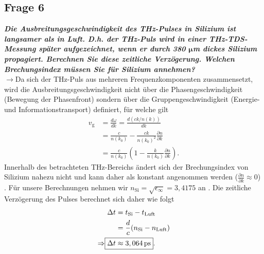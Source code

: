 \subsection{\label{subsec:FZV6}Frage 6}
\textbf{\textit{Die Ausbreitungsgeschwindigkeit des THz-Pulses in Silizium ist langsamer als in
Luft. D.h. der THz-Puls wird in einer THz-TDS-Messung später aufgezeichnet,
wenn er durch 380 $\mathbf{\mu}$m dickes Silizium propagiert. Berechnen Sie diese zeitliche
Verzögerung. Welchen Brechungsindex müssen Sie für Silizium annehmen?}}\\
$\rightarrow$Da sich der THz-Puls aus mehreren Frequenzkomponenten zusammensetzt, wird 
die Ausbreitungsgeschwindigkeit nicht über die Phasengeschwindigkeit (Bewegung der Phasenfront)
sondern über die Gruppengeschwindigkeit (Energie- und Informationstransport) definiert,
für welche gilt
\begin{align}
    v_{\text{g}} &= \frac{d\omega}{dk} = \frac{d(ck/n(k))}{dk} \\
    &= \frac{c}{n(k_{0})} - \frac{ck}{n(k_{0})^{2}}\frac{\partial n}{\partial k} \\
    &= \frac{c}{n(k_{0})}\left(1 - \frac{k}{n(k_{0})}\frac{\partial n}{\partial k}\right).
\end{align}
Innerhalb des betrachteten THz-Bereichs ändert sich der Brechungsindex von Silizium nahezu nicht und kann 
daher als konstant angenommen werden ($\frac{\partial n}{\partial k}\approx0$) \cite{Q9}.
Für unsere Berechnungen nehmen wir $n_{\text{Si}} = \sqrt{\epsilon_{\infty}} = 3,4175$ an \cite{Anleitung}.
Die zeitliche Verzögerung des Pulses berechnet sich daher wie folgt
\begin{align}
    \Delta t &= t_{\text{Si}} - t_{\text{Luft}} \\
    &= \frac{d}{c}(n_{\text{Si}}-n_{\text{Luft}}) \\
    \Rightarrow \Aboxed{\Delta t & \approx 3,064\,\si{ps}}.
\end{align}
